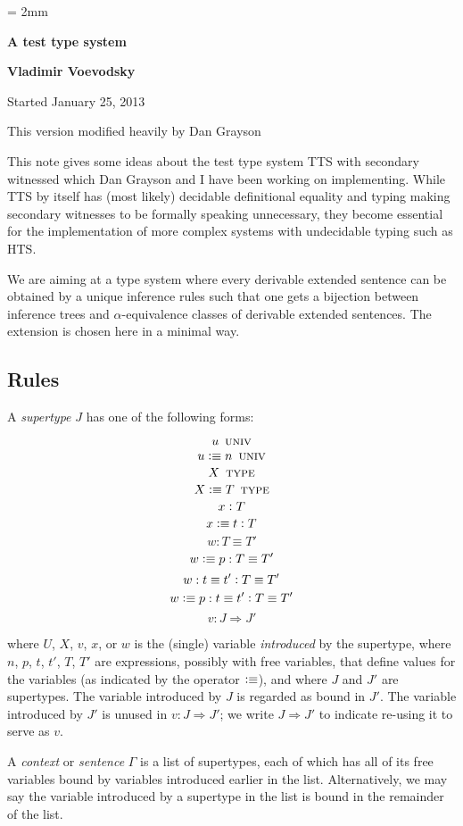 \documentclass[11pt]{article}
\newcommand{\eqd}{\equiv}
\newcommand{\ccolon}{\vcentcolon}
\newcommand{\Univ}{\mathop{\text{ \sc univ}}}
\newcommand{\TYPE}{\mathop{\text{ \sc type}}}
\newcommand{\defn}{\vcentcolon\equiv}
\begin{document}
\parskip = 2mm
\begin{center}
{\bf\Large A test type system}

{\bf Vladimir Voevodsky}

{Started January 25, 2013}  

{This version modified heavily by Dan Grayson}  
\end{center}

\tableofcontents

This note gives some ideas about the test type system TTS with secondary
witnessed which Dan Grayson and I have been working on implementing. While TTS
by itself has (most likely) decidable definitional equality and typing making
secondary witnesses to be formally speaking unnecessary, they become essential
for the implementation of more complex systems with undecidable typing such as
HTS.

We are aiming at a type system where every derivable extended sentence can be
obtained by a unique inference rules such that one gets a bijection between
inference trees and $\alpha$-equivalence classes of derivable extended
sentences.  The extension is chosen here in a minimal way.

\subsection{Rules}

A {\em supertype} $J$ has one of the following forms:

$$ u \Univ $$
$$ u \defn n \Univ $$
$$ X \TYPE $$
$$ X \defn T \TYPE $$
$$ x \ccolon T $$
$$ x \defn t \ccolon T $$
$$ w : T \eqd T' $$
$$ w \defn p : T \eqd T' $$
$$ w : t \eqd t' \ccolon T \eqd T' $$
$$ w \defn p : t \eqd t' \ccolon T \eqd T' $$
$$ v : J \Rightarrow J' $$

where $U$, $X$, $v$, $x$, or $w$ is the (single) variable {\em introduced} by
the supertype, where $n$, $p$, $t$, $t'$, $T$, $T'$ are expressions, possibly
with free variables, that define values for the variables (as indicated by the
operator $\defn$), and where $J$ and $J'$ are supertypes.  The variable
introduced by $J$ is regarded as bound in $J'$.  The variable introduced by
$J'$ is unused in $ v : J \Rightarrow J' $; we write $ J \Rightarrow J' $ to
indicate re-using it to serve as $v$.

A {\em context} or {\em sentence} $\Gamma$ is a list of supertypes, each of
which has all of its free variables bound by variables introduced earlier in
the list.  Alternatively, we may say the variable introduced by a supertype in
the list is bound in the remainder of the list.
\end{document}
